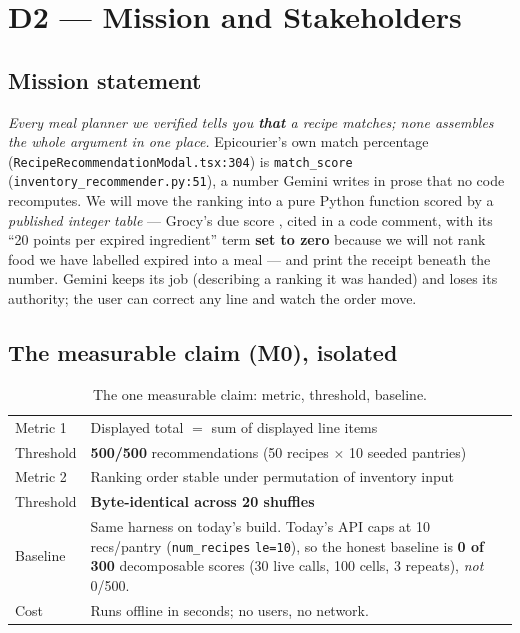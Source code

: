 \documentclass[sigconf,nonacm]{acmart}
\begin{document}
\section{D2 --- Mission and Stakeholders}
\subsection{Mission statement}
\emph{Every meal planner we verified tells you \textbf{that} a recipe matches;
none assembles the whole argument in one place.} Epicourier's own match percentage
(\texttt{RecipeRecommendationModal.tsx:304}) is \texttt{match\_score}
(\texttt{inventory\_recommender.py:51}), a number Gemini writes in prose that no
code recomputes. We will move the ranking into a pure Python function scored by a
\emph{published integer table} --- Grocy's due score \cite{grocy}, cited in a code
comment, with its ``20 points per expired ingredient'' term \textbf{set to zero}
because we will not rank food we have labelled expired into a meal --- and print
the receipt beneath the number. Gemini keeps its job (describing a ranking it was
handed) and loses its authority; the user can correct any line and watch the order
move.

\subsection{The measurable claim (M0), isolated}
\begin{table}[h]\footnotesize\centering\caption{The one measurable claim: metric, threshold, baseline.}\label{tab:m0}
\begin{tabular}{@{}p{1.9cm}p{5.6cm}@{}}
\toprule
Metric 1 & Displayed total $=$ sum of displayed line items \\
Threshold & \textbf{500/500} recommendations (50 recipes $\times$ 10 seeded pantries) \\
Metric 2 & Ranking order stable under permutation of inventory input \\
Threshold & \textbf{Byte-identical across 20 shuffles} \\
Baseline & Same harness on today's build. Today's API caps at 10 recs/pantry (\texttt{num\_recipes} \texttt{le=10}), so the honest baseline is \textbf{0 of 300} decomposable scores (30 live calls, 100 cells, 3 repeats), \emph{not} 0/500. \\
Cost & Runs offline in seconds; no users, no network. \\
\bottomrule
\end{tabular}
\end{table}
\end{document}
